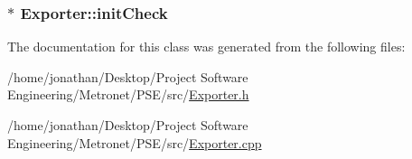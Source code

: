 \subsubsection[{\texorpdfstring{init\+Check}{initCheck}}]{$\ast$ Exporter\+::init\+Check\hspace{0.3cm}{\ttfamily [protected]}}\hypertarget{class_exporter_a74245e988d8e72a43704dda927acff05}{}\label{class_exporter_a74245e988d8e72a43704dda927acff05}


The documentation for this class was generated from the following files\+:\begin{DoxyCompactItemize}
\item 
/home/jonathan/\+Desktop/\+Project Software Engineering/\+Metronet/\+P\+S\+E/src/\hyperlink{_exporter_8h}{Exporter.\+h}\item 
/home/jonathan/\+Desktop/\+Project Software Engineering/\+Metronet/\+P\+S\+E/src/\hyperlink{_exporter_8cpp}{Exporter.\+cpp}\end{DoxyCompactItemize}
